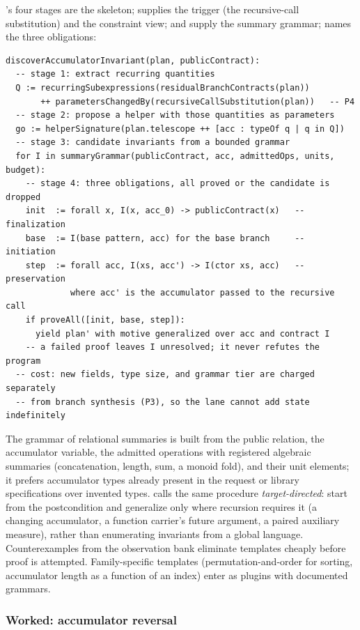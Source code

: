 's four stages are the skeleton;  supplies the trigger (the recursive-call substitution) and the constraint view;  and  supply the summary grammar;  names the three obligations:
\begin{lstlisting}
discoverAccumulatorInvariant(plan, publicContract):
  -- stage 1: extract recurring quantities
  Q := recurringSubexpressions(residualBranchContracts(plan))
       ++ parametersChangedBy(recursiveCallSubstitution(plan))   -- P4
  -- stage 2: propose a helper with those quantities as parameters
  go := helperSignature(plan.telescope ++ [acc : typeOf q | q in Q])
  -- stage 3: candidate invariants from a bounded grammar
  for I in summaryGrammar(publicContract, acc, admittedOps, units, budget):
    -- stage 4: three obligations, all proved or the candidate is dropped
    init  := forall x, I(x, acc_0) -> publicContract(x)   -- finalization
    base  := I(base pattern, acc) for the base branch     -- initiation
    step  := forall acc, I(xs, acc') -> I(ctor xs, acc)   -- preservation
             where acc' is the accumulator passed to the recursive call
    if proveAll([init, base, step]):
      yield plan' with motive generalized over acc and contract I
    -- a failed proof leaves I unresolved; it never refutes the program
  -- cost: new fields, type size, and grammar tier are charged separately
  -- from branch synthesis (P3), so the lane cannot add state indefinitely
\end{lstlisting}
The grammar of relational summaries is built from the public relation, the accumulator variable, the admitted operations with registered algebraic summaries (concatenation, length, sum, a monoid fold), and their unit elements; it prefers accumulator types already present in the request or library specifications over invented types.  calls the same procedure \emph{target-directed}: start from the postcondition and generalize only where recursion requires it (a changing accumulator, a function carrier's future argument, a paired auxiliary measure), rather than enumerating invariants from a global language. Counterexamples from the observation bank eliminate templates cheaply before proof is attempted. Family-specific templates (permutation-and-order for sorting, accumulator length as a function of an index) enter as plugins with documented grammars.

\subsubsection{Worked: accumulator reversal}\label{alg:rec-reverse}

